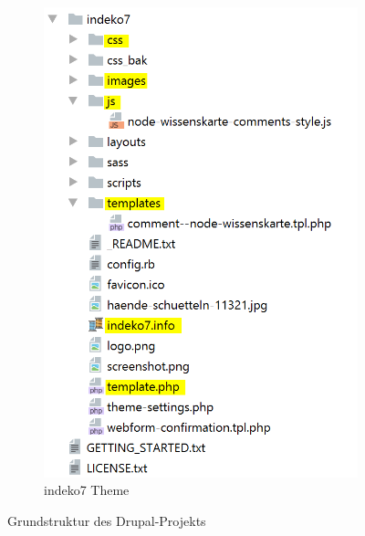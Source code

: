 \begin{figure}[!h]
\begin{subfigure}[A]{0.4\textwidth}
		\includegraphics[height=0.25\textheight]{images/structure_theme}
		\caption[]{indeko7 Theme}
		\label{fig:structuretheme}
	\end{subfigure}
	\caption{Grundstruktur des Drupal-Projekts}
	\label{fig:structure}
\end{figure}



